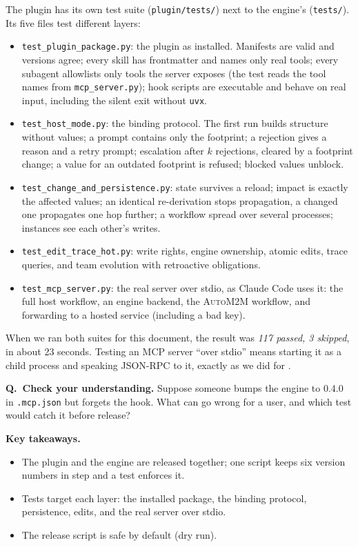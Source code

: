 \documentclass[10pt,a4paper]{article}
\newcommand{\auto}{\textsc{AutoM2M}}
\newcommand{\cc}{Claude Code}
\newcommand{\code}[1]{\texttt{#1}}
\newcommand{\file}[1]{\texttt{#1}}
\newcounter{think}
\newenvironment{think}[1][Check your understanding]{%
  \refstepcounter{think}%
  \begin{tcolorbox}[enhanced, breakable, colback=thinkbg, colframe=thinkbg, arc=0pt, boxrule=0pt,
     borderline west={2.2pt}{0pt}{thinkbar}, left=8pt, right=8pt, top=5pt, bottom=5pt,
     before skip=8pt, after skip=8pt]
  \textsf{\bfseries\color{thinkbar}Q\thethink.\ #1.}\enspace}{\end{tcolorbox}}
\newenvironment{takeaway}{%
  \begin{tcolorbox}[enhanced, breakable, colback=keybg, colframe=keybg, arc=0pt, boxrule=0pt,
     borderline west={2.2pt}{0pt}{keybar}, left=8pt, right=8pt, top=5pt, bottom=5pt,
     before skip=8pt, after skip=8pt]
  \textsf{\bfseries\color{keybar}Key takeaways.}\par\smallskip}{\end{tcolorbox}}
\begin{document}
The plugin has its own test suite (\file{plugin/tests/}) next to the
engine's (\file{tests/}). Its five files test different layers:

\begin{itemize}
\item \file{test_plugin_package.py}: the plugin as installed. Manifests are
valid and versions agree; every skill has frontmatter and names only real
tools; every subagent allowlists only tools the server exposes (the test reads
the tool names from \file{mcp_server.py}); hook scripts are executable and
behave on real input, including the silent exit without \code{uvx}.
\item \file{test_host_mode.py}: the binding protocol. The first run builds
structure without values; a prompt contains only the footprint; a rejection
gives a reason and a retry prompt; escalation after $k$ rejections, cleared by
a footprint change; a value for an outdated footprint is refused; blocked
values unblock.
\item \file{test_change_and_persistence.py}: state survives a reload; impact
is exactly the affected values; an identical re-derivation stops
propagation, a changed one propagates one hop further; a workflow spread over
several processes; instances see each other's writes.
\item \file{test_edit_trace_hot.py}: write rights, engine ownership, atomic
edits, trace queries, and team evolution with retroactive obligations.
\item \file{test_mcp_server.py}: the real server over stdio, as \cc{} uses
it: the full host workflow, an engine backend, the \auto{} workflow, and
forwarding to a hosted service (including a bad key).
\end{itemize}

When we ran both suites for this document, the result was \emph{117 passed, 3
skipped}, in about 23 seconds. Testing an MCP server ``over stdio'' means
starting it as a child process and speaking JSON-RPC to it, exactly as we did
for .

\begin{think}
Suppose someone bumps the engine to 0.4.0 in \file{.mcp.json} but forgets
the hook. What can go wrong for a user, and which test would catch it before
release?
\end{think}

\begin{takeaway}
\begin{itemize}
\item The plugin and the engine are released together; one script keeps six
version numbers in step and a test enforces it.
\item Tests target each layer: the installed package, the binding protocol,
persistence, edits, and the real server over stdio.
\item The release script is safe by default (dry run).
\end{itemize}
\end{takeaway}
\end{document}
